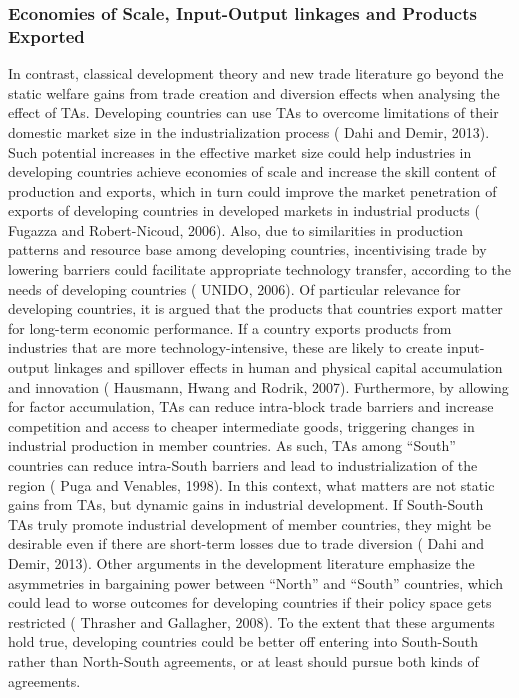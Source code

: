 \documentclass[12pt]{article}%
\begin{document}
\subsubsection{Economies of Scale, Input{-}Output linkages and Products Exported}%
\label{ssubsec:EconomiesofScale,Input{-}OutputlinkagesandProductsExported}%

%
In contrast, classical development theory and new trade literature go
beyond the static welfare gains from trade creation and diversion
effects when analysing the effect of TAs. Developing countries can use
TAs to overcome limitations of their domestic market size in the
industrialization process (\cite{dahi_preferential_2013} Dahi and Demir, 2013). Such potential
increases in the effective market size could help industries in
developing countries achieve economies of scale and increase the skill
content of production and exports, which in turn could improve the
market penetration of exports of developing countries in developed
markets in industrial products (\cite{fugazza_can_2006} Fugazza and Robert-Nicoud, 2006). Also,
due to similarities in production patterns and resource base among
developing countries, incentivising trade by lowering barriers could
facilitate appropriate technology transfer, according to the needs of
developing countries (\cite{unido_industrial_2006} UNIDO, 2006). Of particular relevance for
developing countries, it is argued that the products that countries
export matter for long-term economic performance. If a country exports
products from industries that are more technology-intensive, these are
likely to create input-output linkages and spillover effects in human
and physical capital accumulation and innovation (\cite{hausmann_what_2007} Hausmann, Hwang and
Rodrik, 2007). Furthermore, by allowing for factor accumulation, TAs can
reduce intra-block trade barriers and increase competition and access to
cheaper intermediate goods, triggering changes in industrial production
in member countries. As such, TAs among ``South'' countries can reduce
intra-South barriers and lead to industrialization of the region (\cite{puga_trading_1998} Puga
and Venables, 1998). In this context, what matters are not static gains
from TAs, but dynamic gains in industrial development. If South-South
TAs truly promote industrial development of member countries, they might
be desirable even if there are short-term losses due to trade diversion
(\cite{dahi_preferential_2013} Dahi and Demir, 2013). Other arguments in the development literature
emphasize the asymmetries in bargaining power between ``North'' and
``South'' countries, which could lead to worse outcomes for developing
countries if their policy space gets restricted (\cite{thrasher_21st_2008} Thrasher and Gallagher,
2008). To the extent that these arguments hold true, developing
countries could be better off entering into South-South rather than
North-South agreements, or at least should pursue both kinds of
agreements.
\end{document}
